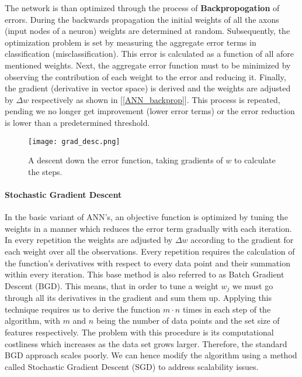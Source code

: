 		\par
		
		The network is than optimized through the process of \textbf{Backpropogation} of errors. During the backwards propagation the initial weights of all the axons (input nodes of a neuron) weights are determined at random. Subsequently, the optimization problem is set by measuring the aggregate error terms in classification (misclassification). This error is calculated as a function of all afore mentioned weights. Next, the aggregate error function must to be minimized by observing the contribution of each weight to the error and reducing it. Finally, the gradient (derivative in vector space) is derived and the weights are adjusted by $ \Delta w $ respectively as shown in [\ref{ANN_backprop}]. This process is repeated, pending we no longer get improvement (lower error terms) or the error reduction is lower than a predetermined threshold.
		
		\begin{figure}[h]
			\centering
			\captionsetup{width=0.8\textwidth}
			\texttt{[image: grad\_desc.png]}
			\caption[ANN Gradient Descent]{
				\footnotesize{
					A descent down the error function, taking gradients of $ w $ to calculate the steps.
				}
			} 
			\label{ANN_backprop1}
		\end{figure}
	
	\paragraph{Stochastic Gradient Descent}
		In the basic variant of ANN's, an objective function is optimized by tuning the weights in a manner which reduces the error term gradually with each iteration. In every repetition the weights are adjusted by $ \Delta w $ according to the gradient for each weight over all the observations. Every repetition  requires the calculation of the function's derivatives with respect to every data point and their summation within every iteration. This base method is also referred to as Batch Gradient Descent (BGD). This means, that in order to tune a weight $ w_j $ we must go through all its derivatives in the gradient and sum them up.  Applying this technique requires us to derive the function $ m \cdot n $ times in each step of the algorithm, with $ m $ and $ n $ being the number of data points and the set size of features respectively. The problem with this procedure is its computational costliness which increases as the data set grows larger. Therefore, the standard BGD approach scales poorly. We can hence modify the algorithm using a method called Stochastic Gradient Descent (SGD) to address scalability issues.
		
